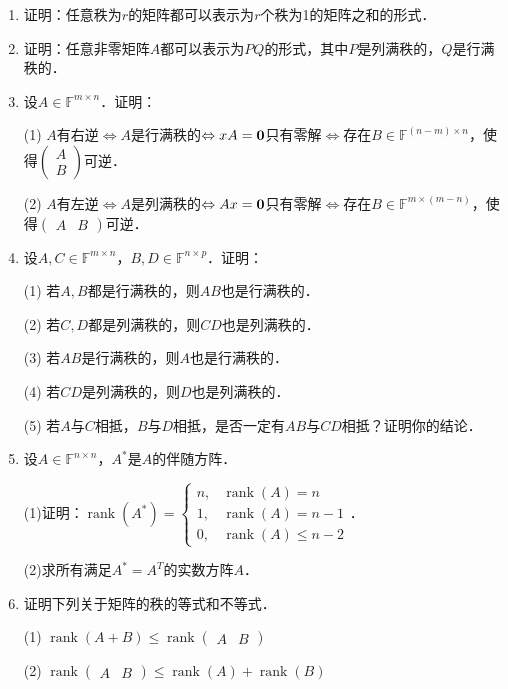 \documentclass[a4paper,fontset=windows]{ctexbook}
\theoremstyle{definition}
\DeclareMathOperator{\rank}{rank}
\renewcommand{\le}{\leqslant}
\begin{document}
\begin{enumerate}
\item 证明：任意秩为$r$的矩阵都可以表示为$r$个秩为1的矩阵之和的形式．

\item 证明：任意非零矩阵$A$都可以表示为$PQ$的形式，其中$P$是列满秩的，$Q$是行满秩的．

\item 设$A\in\mathbb{F}^{m\times n}$．证明：

(1) $A$有右逆$\Leftrightarrow A$是行满秩的$\Leftrightarrow xA={\bf 0}$只有零解$\Leftrightarrow$存在$B\in\mathbb{F}^{(n-m)\times n}$，使得$\begin{pmatrix}A \\ B\end{pmatrix}$可逆．

(2) $A$有左逆$\Leftrightarrow A$是列满秩的$\Leftrightarrow Ax={\bf 0}$只有零解$\Leftrightarrow$存在$B\in\mathbb{F}^{m\times(m-n)}$，使得$\begin{pmatrix}A&B\end{pmatrix}$可逆．

\item 设$A,C\in\mathbb{F}^{m\times n}$，$B,D\in\mathbb{F}^{n\times p}$．证明：

(1) 若$A,B$都是行满秩的，则$AB$也是行满秩的．

(2) 若$C,D$都是列满秩的，则$CD$也是列满秩的．

(3) 若$AB$是行满秩的，则$A$也是行满秩的．

(4) 若$CD$是列满秩的，则$D$也是列满秩的．

(5) 若$A$与$C$相抵，$B$与$D$相抵，是否一定有$AB$与$CD$相抵？证明你的结论．

\item 设$A\in\mathbb{F}^{n\times n}$，$A^*$是$A$的伴随方阵．

(1)证明：$\rank(A^*)=\begin{cases}n,&\rank(A)=n \\ 1,&\rank(A)=n-1 \\ 0,&\rank(A)\le n-2\end{cases}$．

(2)求所有满足$A^*=A^T$的实数方阵$A$．

\item 证明下列关于矩阵的秩的等式和不等式．

(1) $\rank(A+B)\le\rank\begin{pmatrix}A&B\end{pmatrix}$

(2) $\rank\begin{pmatrix}A&B\end{pmatrix}\le\rank(A)+\rank(B)$


\end{enumerate}
\end{document}
